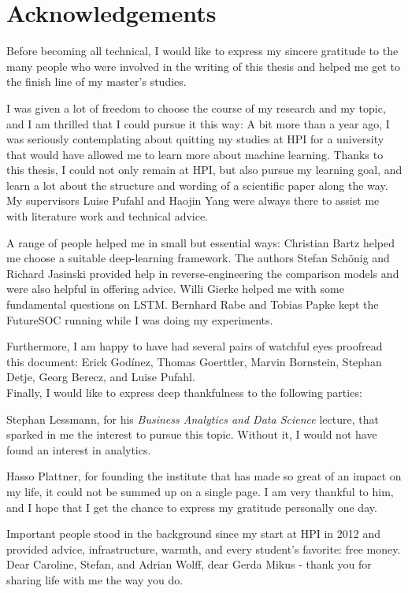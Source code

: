 
\begingroup

\let\clearpage\relax
\let\cleardoublepage\relax
\let\cleardoublepage\relax

\chapter*{Acknowledgements}
Before becoming all technical, I would like to express my sincere gratitude to the many people who were involved in the writing of this thesis and helped me get to the finish line of my master's studies.

I was given a lot of freedom to choose the course of my research and my topic, and I am thrilled that I could pursue it this way:
A bit more than a year ago,  I was seriously contemplating about quitting my studies at HPI for a university that would have allowed me to learn more about machine learning.
Thanks to this thesis, I could not only remain at HPI, but also pursue my learning goal, and learn a lot about the structure and wording of a scientific paper along the way. My supervisors Luise Pufahl and Haojin Yang were always there to assist me with literature work and technical advice.

A range of people helped me in small but essential ways:
Christian Bartz helped me choose a suitable deep-learning framework.
The authors Stefan Schönig and Richard Jasinski provided help in reverse-engineering the comparison models and were also helpful in offering advice.
Willi Gierke helped me with some fundamental questions on LSTM.
Bernhard Rabe and Tobias Papke kept the FutureSOC running while I was doing my experiments.

Furthermore, I am happy to have had several pairs of watchful eyes proofread this document:
Erick Godínez, Thomas Goerttler, Marvin Bornstein, Stephan Detje, Georg Berecz, and Luise Pufahl.\\

Finally, I would like to express deep thankfulness to the following parties:

Stephan Lessmann, for his \textit{Business Analytics and Data Science} lecture, that sparked in me the interest to pursue this topic. Without it, I would not have found an interest in analytics.

Hasso Plattner, for founding the institute that has made so great of an impact on my life, it could not be summed up on a single page.
I am very thankful to him, and I hope that I get the chance to express my gratitude personally one day.

Important people stood in the background since my start at HPI in 2012 and provided advice, infrastructure, warmth, and every student's favorite: free money. Dear Caroline, Stefan, and Adrian Wolff, dear Gerda Mikus - thank you for sharing life with me the way you do.
\endgroup
